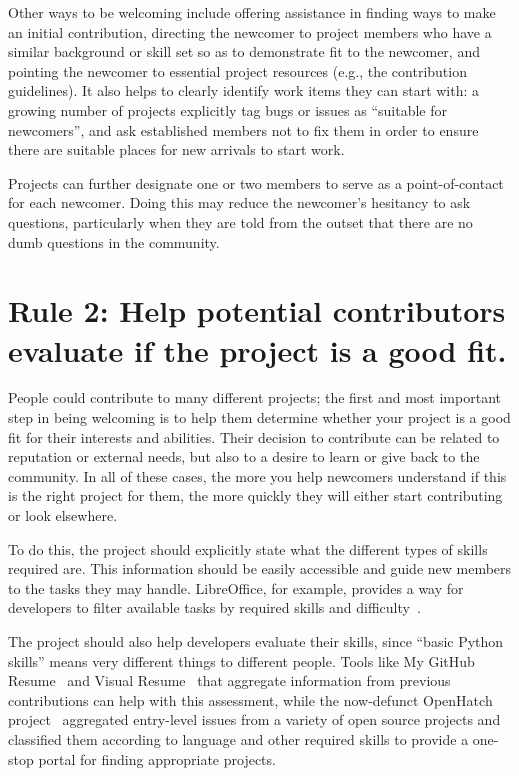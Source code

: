 \documentclass[10pt,letterpaper]{article}
\newcommand{\rulemajor}[1]{\section*{#1}}
\begin{document}
Other ways to be welcoming include
offering assistance in finding ways to make an initial contribution,
directing the newcomer to project members who have a similar background or skill set
so as to demonstrate fit to the newcomer,
and pointing the newcomer to essential project resources (e.g., the contribution guidelines).
It also helps to clearly identify work items they can start with:
a growing number of projects explicitly tag bugs or issues as ``suitable for newcomers'',
and ask established members not to fix them
in order to ensure there are suitable places for new arrivals to start work.
  
Projects can further designate one or two members to serve as a point-of-contact for each newcomer.
Doing this may reduce the newcomer's hesitancy to ask questions,
particularly when they are told from the outset that there are no dumb questions in the community.

\rulemajor{Rule 2: Help potential contributors evaluate if the project is a good fit.}

People could contribute to many different projects;
the first and most important step in being welcoming is to help them determine whether
your project is a good fit for their interests and abilities.
Their decision to contribute can be related to reputation or external needs,
but also to a desire to learn or give back to the community.
In all of these cases,
the more you help newcomers understand if this is the right project for them,
the more quickly they will either start contributing or look elsewhere.

To do this,
the project should explicitly state what the different types of skills required are.
This information should be easily accessible and guide new members to the tasks they may handle.
LibreOffice,
for example,
provides a way for developers to filter available tasks by required skills and difficulty~\cite{libreoffice-filtered}.

The project should also help developers evaluate their skills,
since ``basic Python skills'' means very different things to different people.
Tools like My GitHub Resume~\cite{my-github-resume} and Visual Resume~\cite{sarma2016}
that aggregate information from previous contributions can help with this assessment,
while the now-defunct OpenHatch project~\cite{openhatch}
aggregated entry-level issues from a variety of open source projects
and classified them according to language and other required skills
to provide a one-stop portal for finding appropriate projects.
\end{document}
